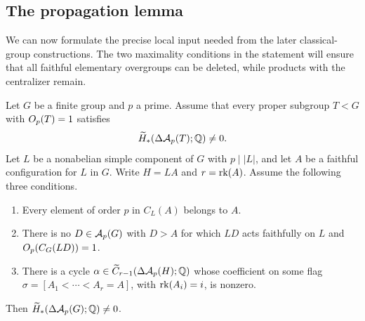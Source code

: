 \subsection{The propagation lemma}

We can now formulate the precise local input needed from the later
classical-group constructions.  The two maximality conditions in the
statement will ensure that all faithful elementary overgroups can be
deleted, while products with the centralizer remain.

\begin{lemma}[Propagation]\label{lem:propagation}
Let $G$ be a finite group and $p$ a prime.  Assume that every proper
subgroup $T<G$ with $O_p(T)=1$ satisfies
\[
 \widetilde H_*(\Delta\mathcal A_p(T);\mathbb Q)\ne0.
\]
Let $L$ be a nonabelian simple component of $G$ with $p\mid |L|$,
and let $A$ be a faithful configuration for $L$ in $G$.
Write $H=LA$ and $r=\operatorname{rk}(A)$.  Assume the following three conditions.
\begin{enumerate}[label=\textup{(\roman*)}]
\item Every element of order $p$ in $C_L(A)$ belongs to $A$.
\item There is no $D\in\mathcal A_p(G)$ with $D>A$ for which $LD$ acts
faithfully on $L$ and $O_p(C_G(LD))=1$.
\item There is a cycle
$\alpha\in\widetilde C_{r-1}(\Delta\mathcal A_p(H);\mathbb Q)$ whose coefficient
on some flag
$\sigma=[A_1<\cdots<A_r=A]$, with $\operatorname{rk}(A_i)=i$, is nonzero.
\end{enumerate}
Then $\widetilde H_*(\Delta\mathcal A_p(G);\mathbb Q)\ne0$.
\end{lemma}

